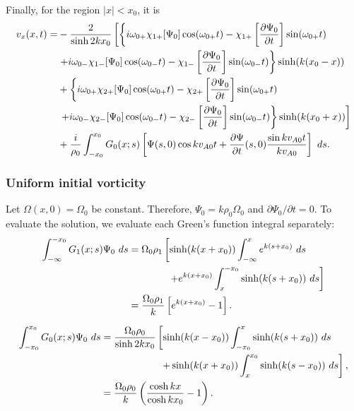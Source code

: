 \documentclass[12pt, draft]{../style-files/ociamthesis}
\begin{document}
Finally, for the region $|x|<x_0$, it is
\begin{align}
v_x(x, t) =& -\frac{2}{\sinh{2kx_0}} \left[ \left\{ i\omega_{0+}\chi_{1+}[\Psi_0] \cos(\omega_{0+} t) - \chi_{1+}\left[ \frac{\partial \Psi_0}{\partial t} \right] \sin(\omega_{0+} t) \right. \right. \notag \\
& \left. + i\omega_{0-}\chi_{1-}[\Psi_0] \cos(\omega_{0-} t) - \chi_{1-}\left[ \frac{\partial \Psi_0}{\partial t} \right] \sin(\omega_{0-} t) \right\} \sinh(k(x_0 - x)) \notag \\ 
& + \left\{ i\omega_{0+}\chi_{2+}[\Psi_0] \cos(\omega_{0+} t) - \chi_{2+}\left[ \frac{\partial \Psi_0}{\partial t} \right] \sin(\omega_{0+} t) \right. \notag \\
& \left. \left. + i\omega_{0-}\chi_{2-}[\Psi_0] \cos(\omega_{0-} t) - \chi_{2-}\left[ \frac{\partial \Psi_0}{\partial t} \right] \sin(\omega_{0-} t) \right\} \sinh(k(x_0 + x)) \right] \notag \\
& + \frac{i}{\rho_0} \int_{-x_0}^{x_0} G_0(x;s) \left[ \Psi(s, 0) \cos{kv_{A0}t} + \frac{\partial \Psi}{\partial t}(s, 0) \frac{\sin{kv_{A0}t}}{kv_{A0}} \right]~ds.
\end{align}


\subsubsection{Uniform initial vorticity}

Let $\Omega(x, 0) = \Omega_0$ be constant. Therefore, $\Psi_0 = k\rho_0\Omega_0$ and $\partial \Psi_0 / \partial t = 0$. To evaluate the solution, we evaluate each Green's function integral separately:
\begin{align}
\int_{-\infty}^{-x_0} G_1(x;s) \Psi_0 ~ds &= \Omega_0 \rho_1 \left[ \sinh(k(x+x_0)) \int_{-\infty}^{x} e^{k(s + x_0)} ~ds \right . \notag \\
&\qquad \qquad \left.+ e^{k(x+x_0)} \int_{x}^{-x_0} \sinh(k(s+x_0)) ~ds \right] \notag \\
&= \frac{\Omega_0 \rho_1}{k} \left[ e^{k(x+x_0)} - 1 \right].
\end{align}

\begin{align}
\int_{-x_0}^{x_0} G_0(x;s) \Psi_0 ~ds &= \frac{\Omega_0 \rho_0}{\sinh{2kx_0}} \left[ \sinh(k(x-x_0)) \int_{-x_0}^{x} \sinh(k(s+x_0)) ~ds \right. \notag \\
&\qquad \qquad \qquad \left. + \sinh(k(x+x_0)) \int_{x}^{x_0} \sinh(k(s-x_0)) ~ds \right], \notag \\
&= \frac{\Omega_0 \rho_0}{k} \left( \frac{\cosh{kx}}{\cosh{kx_0}} - 1 \right).
\end{align}
\end{document}
